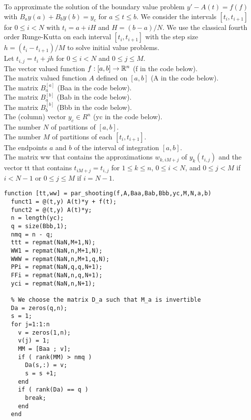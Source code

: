 \begin{code} \label{parShootCode}
To approximate the solution of the boundary value problem
$y' - A(t) = f(f)$ with $B_a y(a) + B_b y(b) = y_c$  for $a \leq t \leq b$.
We consider the intervals $[t_i,t_{i+1}]$ for $0 \leq i < N$ with
$t_i = a + i H$ and $H = (b-a)/N$.  We use the classical fourth order
Runge-Kutta on each interval $[t_i,t_{i+1}]$ with the step size
$h = (t_i - t_{i+1})/M$ to solve initial value problems.\\
Let $t_{i,j} = t_i + j h$ for $0\leq i < N$ and $0 \leq j \leq M$.\\
 The vector valued function $f:[a,b] \to \mathbb{R}^n$ (f in the
code below).\\
The \nn matrix valued function $A$ defined on $[a,b]$ (A in the code
below).\\
The  matrix $B_a^{[a]}$ (Baa in the code below).\\
The  matrix $B_a^{[b]}$ (Bab in the code below).\\
The  matrix $B_b^{[b]}$ (Bbb in the code below).\\
The (column) vector $y_c \in R^n$ (yc in the code below).\\
The number $N$ of partitions of $[a,b]$.\\
The number $M$ of partitions of each $[t_i,t_{i+1}]$.\\
The endpoints $a$ and $b$ of the interval of integration $[a,b]$.\\
 The  matrix ww that contains the approximations
$w_{k,iM+j}$ of $y_k(t_{i,j})$ and the vector tt that contains
$t_{iM+j} = t_{i,j}$ for $1 \leq k \leq n$, $0 \leq i < N$, and
$0 \leq j < M$ if $i<N-1$ or $0 \leq j \leq M$ if $i=N-1$.  
\small
\begin{verbatim}
function [tt,ww] = par_shooting(f,A,Baa,Bab,Bbb,yc,M,N,a,b)
  funct1 = @(t,y) A(t)*y + f(t);
  funct2 = @(t,y) A(t)*y;
  n = length(yc);
  q = size(Bbb,1);
  nmq = n - q;
  ttt = repmat(NaN,M+1,N);
  WW1 = repmat(NaN,n,M+1,N);
  WWW = repmat(NaN,n,M+1,q,N);
  PPi = repmat(NaN,q,q,N+1);
  FFi = repmat(NaN,n,q,N+1);
  yci = repmat(NaN,n,N+1);
    
  % We choose the matrix D_a such that M_a is invertible
  Da = zeros(q,n);
  s = 1;
  for j=1:1:n
    v = zeros(1,n);
    v(j) = 1;
    MM = [Baa ; v];
    if ( rank(MM) > nmq )
      Da(s,:) = v;
      s = s +1;
    end
    if ( rank(Da) == q )
      break;
    end
  end


\end{verbatim}
\end{code}
